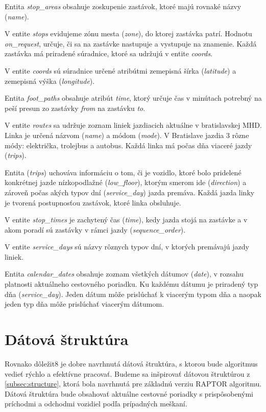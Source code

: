 Entita \textit{stop\_areas} obsahuje zoskupenie zastávok, ktoré majú rovnaké názvy (\textit{name}). 


V entite \textit{stops} evidujeme zónu mesta (\textit{zone}), do ktorej zastávka patrí. Hodnotu \textit{on\_request}, určuje, či sa na  zastávke nastupuje a vystupuje na znamenie. Každá zastávka má priradené súradnice, ktoré sa udržujú v entite \textit{coords}.

V entite \textit{coords} sú súradnice určené atribútmi zemepisná šírka (\textit{latitude}) a zemepisná výška (\textit{longitude}). 

Entita \textit{foot\_paths} obsahuje atribút \textit{time}, ktorý určuje čas v minútach potrebný na peší presun zo zastávky \textit{from} na zastávku \textit{to}.

V entite \textit{routes} sa udržuje zoznam liniek jazdiacich aktuálne v bratislavskej MHD. Linka je určená názvom (\textit{name}) a módom (\textit{mode}). V Bratislave jazdia 3 rôzne módy: električka, trolejbus a autobus. Každá linka má počas dňa viaceré jazdy (\textit{trips}).

Entita (\textit{trips}) uchováva informáciu o tom, či je vozidlo, ktoré bolo pridelené konkrétnej jazde nízkopodlažné (\textit{low\_floor}), ktorým smerom ide (\textit{direction}) a zároveň počas akých typov dní (\textit{service\_day}) jazda premáva. Každá jazda linky je tvorená postupnosťou zastávok, ktoré linka obsluhuje.

V entite \textit{stop\_times} je zachytený čas (\textit{time}), kedy jazda stojá na zastávke a v akom poradí sú zastávky v rámci jazdy (\textit{sequence\_order}).

V entite \textit{service\_days} sú názvy rôznych typov dní, v ktorých premávajú jazdy liniek. 

Entita \textit{calendar\_dates} obsahuje zoznam všetkých dátumov (\textit{date}), v rozsahu platnosti aktuálneho cestovného poriadku. Ku každému dátumu je priradený typ dňa (\textit{service\_day}). Jeden dátum môže prislúchať k viacerým typom dňa a naopak jeden typ dňa môže prislúchať viacerým dátumom.

\section{Dátová štruktúra}
Rovnako dôležit8 je dobre navrhnutá dátová štruktúra, s ktorou bude algoritmus vedieť rýchlo a efektívne pracovať. Budeme sa inšpirovať dátovou štruktúrou z \ref{subsec:structure}, ktorá bola navrhnutá pre základnú verziu RAPTOR algoritmu. Dátová štruktúra bude obsahovať aktuálne cestovné poriadky s prispôsobenými príchodmi a odchodmi vozidiel podľa prípadných meškaní.  

